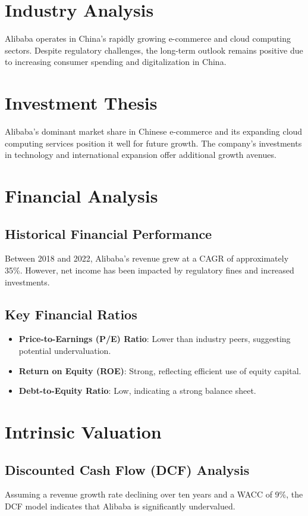 \documentclass[12pt]{report}
\begin{document}
\section{Industry Analysis}
Alibaba operates in China's rapidly growing e-commerce and cloud computing sectors. Despite regulatory challenges, the long-term outlook remains positive due to increasing consumer spending and digitalization in China.

\section{Investment Thesis}
Alibaba's dominant market share in Chinese e-commerce and its expanding cloud computing services position it well for future growth. The company's investments in technology and international expansion offer additional growth avenues.

\section{Financial Analysis}
\subsection{Historical Financial Performance}
Between 2018 and 2022, Alibaba's revenue grew at a CAGR of approximately 35\%. However, net income has been impacted by regulatory fines and increased investments.

\subsection{Key Financial Ratios}
\begin{itemize}
    \item \textbf{Price-to-Earnings (P/E) Ratio}: Lower than industry peers, suggesting potential undervaluation.
    \item \textbf{Return on Equity (ROE)}: Strong, reflecting efficient use of equity capital.
    \item \textbf{Debt-to-Equity Ratio}: Low, indicating a strong balance sheet.
\end{itemize}

\section{Intrinsic Valuation}
\subsection{Discounted Cash Flow (DCF) Analysis}
Assuming a revenue growth rate declining over ten years and a WACC of 9\%, the DCF model indicates that Alibaba is significantly undervalued.
\end{document}
